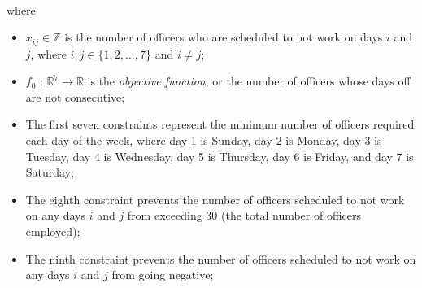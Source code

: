 \begin{homeworkProblem}
\begin{solution}
\[\begin{array}{rl}
            \end{array}
        \]
        where
        \begin{itemize}
            \item $x_{ij} \in \mathbb{Z}$ is the number of officers who are scheduled to not work on days \(i\) and \(j\),
            where $i, j \in \{ 1, 2, \dots, 7 \}$ and $i \neq j$;
            \item $f_0$ : $\mathbb{R}^7 \to \mathbb{R}$ is the \textit{objective function}, 
            or the number of officers whose days off are not consecutive;
            \item The first seven constraints represent the minimum number of officers required each day of the week,
            where day 1 is Sunday, day 2 is Monday, day 3 is Tuesday, day 4 is Wednesday, day 5 is Thursday, day 6 is 
            Friday, and day 7 is Saturday;
            \item The eighth constraint prevents the number of officers scheduled to not work on any days $i$ and $j$
            from exceeding 30 (the total number of officers employed);
            \item The ninth constraint prevents the number of officers scheduled to not work on any days $i$ and $j$
            from going negative;
        \end{itemize}
    

    \end{solution}

\end{homeworkProblem}